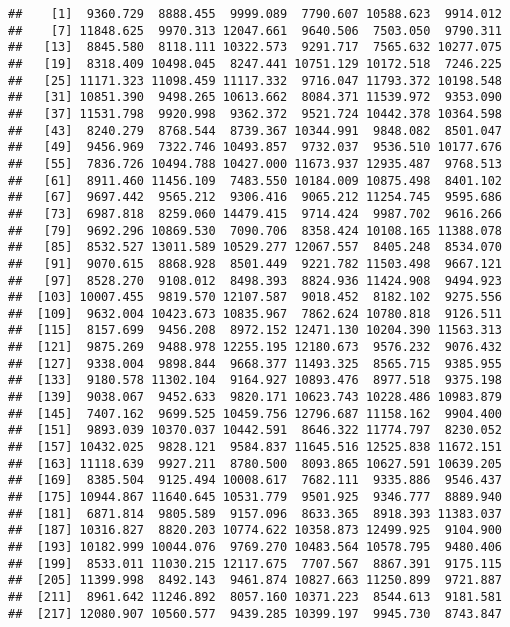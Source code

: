 \documentclass[]{article}
\begin{document}
\begin{verbatim}
##    [1]  9360.729  8888.455  9999.089  7790.607 10588.623  9914.012
##    [7] 11848.625  9970.313 12047.661  9640.506  7503.050  9790.311
##   [13]  8845.580  8118.111 10322.573  9291.717  7565.632 10277.075
##   [19]  8318.409 10498.045  8247.441 10751.129 10172.518  7246.225
##   [25] 11171.323 11098.459 11117.332  9716.047 11793.372 10198.548
##   [31] 10851.390  9498.265 10613.662  8084.371 11539.972  9353.090
##   [37] 11531.798  9920.998  9362.372  9521.724 10442.378 10364.598
##   [43]  8240.279  8768.544  8739.367 10344.991  9848.082  8501.047
##   [49]  9456.969  7322.746 10493.857  9732.037  9536.510 10177.676
##   [55]  7836.726 10494.788 10427.000 11673.937 12935.487  9768.513
##   [61]  8911.460 11456.109  7483.550 10184.009 10875.498  8401.102
##   [67]  9697.442  9565.212  9306.416  9065.212 11254.745  9595.686
##   [73]  6987.818  8259.060 14479.415  9714.424  9987.702  9616.266
##   [79]  9692.296 10869.530  7090.706  8358.424 10108.165 11388.078
##   [85]  8532.527 13011.589 10529.277 12067.557  8405.248  8534.070
##   [91]  9070.615  8868.928  8501.449  9221.782 11503.498  9667.121
##   [97]  8528.270  9108.012  8498.393  8824.936 11424.908  9494.923
##  [103] 10007.455  9819.570 12107.587  9018.452  8182.102  9275.556
##  [109]  9632.004 10423.673 10835.967  7862.624 10780.818  9126.511
##  [115]  8157.699  9456.208  8972.152 12471.130 10204.390 11563.313
##  [121]  9875.269  9488.978 12255.195 12180.673  9576.232  9076.432
##  [127]  9338.004  9898.844  9668.377 11493.325  8565.715  9385.955
##  [133]  9180.578 11302.104  9164.927 10893.476  8977.518  9375.198
##  [139]  9038.067  9452.633  9820.171 10623.743 10228.486 10983.879
##  [145]  7407.162  9699.525 10459.756 12796.687 11158.162  9904.400
##  [151]  9893.039 10370.037 10442.591  8646.322 11774.797  8230.052
##  [157] 10432.025  9828.121  9584.837 11645.516 12525.838 11672.151
##  [163] 11118.639  9927.211  8780.500  8093.865 10627.591 10639.205
##  [169]  8385.504  9125.494 10008.617  7682.111  9335.886  9546.437
##  [175] 10944.867 11640.645 10531.779  9501.925  9346.777  8889.940
##  [181]  6871.814  9805.589  9157.096  8633.365  8918.393 11383.037
##  [187] 10316.827  8820.203 10774.622 10358.873 12499.925  9104.900
##  [193] 10182.999 10044.076  9769.270 10483.564 10578.795  9480.406
##  [199]  8533.011 11030.215 12117.675  7707.567  8867.391  9175.115
##  [205] 11399.998  8492.143  9461.874 10827.663 11250.899  9721.887
##  [211]  8961.642 11246.892  8057.160 10371.223  8544.613  9181.581
##  [217] 12080.907 10560.577  9439.285 10399.197  9945.730  8743.847

\end{verbatim}
\end{document}

